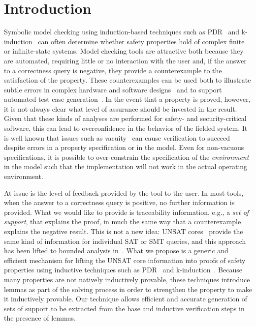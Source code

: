 \section{Introduction}
\label{sec:intro}


Symbolic model checking using induction-based techniques such as PDR~\cite{Een} and k-induction~\cite{Sheeran} can often determine whether safety properties hold of complex finite or infinite-state systems.  Model checking tools are attractive both because they are automated, requiring little or no interaction with the user and, if the answer to a correctness query is negative, they provide a counterexample to the satisfaction of the property.  These counterexamples can be used both to illustrate subtle errors in complex hardware and software designs~\cite{SoftwareModelCheckingTakesOff, more} and to support automated test case generation~\cite{Heimdahl, Gargantini}.
In the event that a property is proved, however, it is not always clear what level of assurance should be invested in the result.  Given that these kinds of analyses are performed for safety- and security-critical software, this can lead to overconfidence in the behavior of the fielded system.  It is well known that issues such as vacuity~\cite{Kupferman} can cause verification to succeed despite errors in a property specification or in the model. Even for non-vacuous specifications, it is possible to over-constrain the specification of the {\em environment} in the model such that the implementation will not work in the actual operating environment.

At issue is the level of feedback provided by the tool to the user.  In most tools, when the answer to a correctness query is positive, no further information is provided.  What we would like to provide is traceability information, e.g., a {\em set of support}, that explains the proof, in much the same way that a counterexample explains the negative result.  This is not a new idea: UNSAT cores~\cite{Who Did this?} provide the same kind of information for individual SAT or SMT queries, and this approach has been lifted to bounded analysis in~\cite{Kodkodpaper}.  What we propose is a generic and efficient mechanism for lifting the UNSAT core information into proofs of safety properties using inductive techniques such as PDR~\cite{Een} and k-induction~\cite{Sheeran}.  Because many properties are not natively inductively provable, these techniques introduce lemmas as part of the solving process in order to strengthen the property to make it inductively provable.  Our technique allows efficient and accurate generation of sets of support to be extracted from the base and inductive verification steps in the presence of lemmas.

